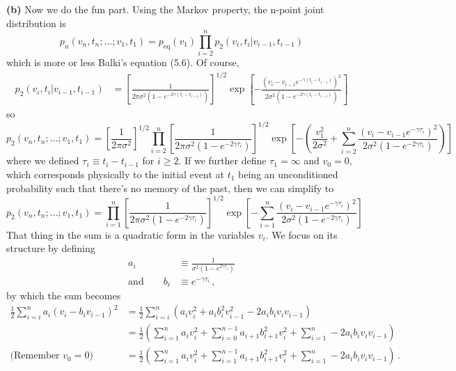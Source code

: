 \textbf{(b)} Now we do the fun part.
Using the Markov property, the n-point joint distribution is
\begin{equation*}
  p_n(v_n, t_n;\ldots;v_1, t_1) = p_\text{eq}(v_1) \prod_{i=2}^n p_2(v_i, t_i|v_{i-1}, t_{i-1})
\end{equation*}
which is more or less Balki's equation (5.6).
Of course,
\begin{align*}
  p_2(v_i, t_i | v_{i-1}, t_{i-1})
  &= \left[ \frac{1}{2 \pi \sigma^2 ( 1 - e^{-2 \gamma (t_i - t_{i-1})})}\right]^{1/2}
    \exp \left[
      - \frac{ \left( v_i - v_{i-1} e^{-\gamma (t_i - t_{i-1})} \right)^2}{2 \sigma^2 (1 - e^{-2 \gamma (t_i - t_{i-1})})}
    \right]
\end{align*}
so
\begin{equation*}
  p_2(v_n, t_n ; \ldots ; v_1, t_1)
  =
  \left[ \frac{1}{2\pi \sigma^2} \right]^{1/2}
  \prod_{i=2}^n
    \left[ \frac{1}{2 \pi \sigma^2 (1 - e^{-2\gamma \tau_i})} \right]^{1/2}
  \exp \left[ - \left(
    \frac{v_1^2}{2 \sigma^2}
    + \sum_{i=2}^n \frac{\left( v_i - v_{i-1} e^{-\gamma \tau_i}\right)^2}{2 \sigma^2 \left( 1 - e^{-2 \gamma \tau_i}\right)}
  \right) \right]
\end{equation*}
where we defined $\tau_i \equiv t_i - t_{i-1}$ for $i\geq2$.
If we further define $\tau_1 = \infty$ and $v_0=0$, which corresponds physically to the initial event at $t_1$ being an unconditioned probability such that there's no memory of the past, then we can simplify to
\begin{equation*}
  p_2(v_n, t_n ; \ldots ; v_1, t_1)
  =
  \prod_{i=1}^n
    \left[ \frac{1}{2 \pi \sigma^2 (1 - e^{-2\gamma \tau_i})} \right]^{1/2}
  \exp \left[ -
    \sum_{i=1}^n \frac{\left( v_i - v_{i-1} e^{-\gamma \tau_i}\right)^2}{2 \sigma^2 \left( 1 - e^{-2 \gamma \tau_i}\right)}
  \right]
\end{equation*}
That thing in the sum is a quadratic form in the variables $v_i$.
We focus on its structure by defining
\begin{align*}
  a_i &\equiv \frac{1}{\sigma^2 \left( 1 - e^{2 \gamma \tau_i} \right)} \\
  \text{and} \qquad
  b_i & \equiv e^{-\gamma \tau_i}\, ,
\end{align*}
by which the sum becomes
\begin{align*}
  \frac{1}{2} \sum_{i=i}^n a_i (v_i - b_i v_{i-1})^2
  &= \frac{1}{2} \sum_{i=i}^n \left( a_i v_i^2 + a_i b_i^2 v_{i-1}^2 - 2 a_i b_i v_i v_{i-1} \right) \\
  &= \frac{1}{2} \left(
    \sum_{i=1}^n a_i v_i^2
  + \sum_{i=0}^{n-1} a_{i+1} b_{i+1}^2 v_i^2
  + \sum_{i=1}^n -2 a_i b_i v_i v_{i-1}
  \right) \\
  \text{(Remember $v_0=0$)} \quad &= \frac{1}{2} \left(
    \sum_{i=1}^n a_i v_i^2
  + \sum_{i=1}^{n-1} a_{i+1} b_{i+1}^2 v_i^2
  + \sum_{i=1}^n -2 a_i b_i v_i v_{i-1}
  \right)
  \, .
\end{align*}
